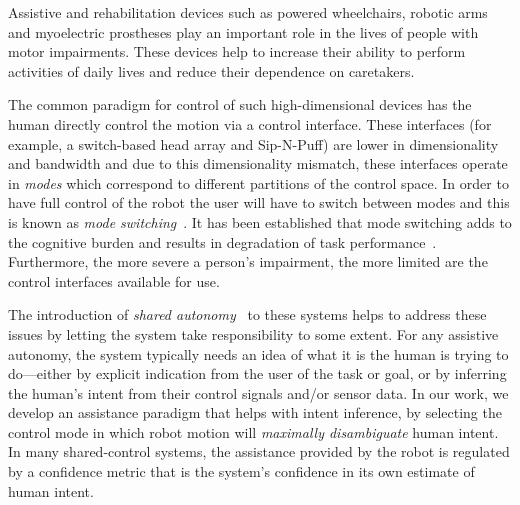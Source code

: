 \documentclass[conference]{IEEEtran}
\begin{document}
Assistive and rehabilitation devices such as powered wheelchairs, robotic arms and myoelectric prostheses play an important role in the lives of people with motor impairments. These devices help to increase their ability to perform activities of daily lives and reduce their dependence on caretakers.

The common paradigm for control of such high-dimensional devices has the human directly control the motion via a control interface.  These interfaces (for example,  a switch-based head array and Sip-N-Puff) are lower in dimensionality and bandwidth and due to this dimensionality mismatch, these interfaces operate in \textit{modes} which correspond to different partitions of the control space. In order to have full control of the robot the user will have to switch between modes and this is known as \textit{mode switching}~\cite{tsui2008development}. 
It has been established that mode switching adds to the cognitive burden and results in degradation of task performance~\cite{monsell2003task}.  Furthermore, the more severe a person's impairment, the more limited are the control interfaces available for use.

 The introduction of \textit{shared autonomy}~\cite{volosyak2005rehabilitation} to these systems helps to address these issues by letting the system take responsibility to some extent.
For any assistive autonomy, the system typically needs an idea of what it is the human is trying to do---either by explicit indication from the user of the task or goal, or by inferring the human's intent from their control signals and/or sensor data. In our work, we develop an assistance paradigm that helps with intent inference, by selecting the control mode in which robot motion will \textit{maximally disambiguate} human intent. 
In many shared-control systems, the assistance provided by the robot is regulated by a confidence metric that is the system's confidence in its own estimate of human intent. 
\end{document}
